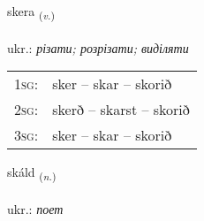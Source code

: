 \documentclass[frontgrid, backgrid]{flacards}\usepackage[]{graphicx}\usepackage[]{xcolor}
\begin{document}
\renewcommand{\flhead}{\vskip5pt \fboxsep=0pt {\small\bfseries\footnotesize Sagnorð | дієслово}}
\renewcommand{\fcfoot}{\vskip5pt \fboxsep=0pt \hspace{2pt}{\small\bfseries\footnotesize 1K}}

\renewcommand{\blhead}{\vskip5pt {\small\bfseries\footnotesize Sagnorð | дієслово }}
\renewcommand{\bcfoot}{\vskip5pt \hspace{2pt}{\small\bfseries\footnotesize 1K}}


{skera \small{\textsubscript{(\textit{v.})}} \\[1ex] %
\textphonetic{[scɛːra]} \\
ukr.: \emph{різати; розрізати; виділяти} \\  [2ex]
\renewcommand*{\arraystretch}{0.8}
\begin{tabular}{p{1cm}l}
\textsc{1sg}: & sker -- skar -- skorið \\ 
\textsc{2sg}: & skerð -- skarst -- skorið \\ 
\textsc{3sg}: & sker -- skar -- skorið \\ 
\end{tabular}
}

\renewcommand{\flhead}{\vskip5pt \fboxsep=0pt {\small\bfseries\footnotesize Nafnorð | іменник}}
\renewcommand{\fcfoot}{\vskip5pt \fboxsep=0pt \hspace{2pt}{\small\bfseries\footnotesize 1K}}

\renewcommand{\blhead}{\vskip5pt {\small\bfseries\footnotesize Nafnorð | іменник }}
\renewcommand{\bcfoot}{\vskip5pt \hspace{2pt}{\small\bfseries\footnotesize 1K}}


{skáld \small{\textsubscript{(\textit{n.})}} \\[1ex] %
\textphonetic{[skault]} \\
ukr.: \emph{поет} \\  [2ex]
\renewcommand*{\arraystretch}{0.8}
}
\end{document}
